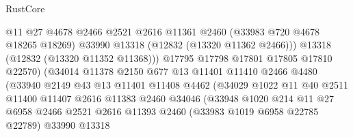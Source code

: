 \begin{lexlean}{RustCore}
\begin{coremodule}
                                    @11
                                    @27
                                    @4678
                                    @2466
                                    @2521
                                    @2616
                                    @11361
                                    @2460
                                    (@33983 @720 @4678 @18265 @18269)
                                    @33990
                                    @13318
                                    (@12832 (@13320 @11362 @2466)))
                                  @13318
                                  (@12832 (@13320 @11352 @11368)))
                                @17795
                                @17798
                                @17801
                                @17805
                                @17810
                                @22570)
                              (@34014
                                @11378
                                @2150
                                @677
                                @13
                                @11401
                                @11410
                                @2466
                                @4480
                                (@33940
                                  @2149
                                  @43
                                  @13
                                  @11401
                                  @11408
                                  @4462
                                  (@34029
                                    @1022
                                    @11
                                    @40
                                    @2511
                                    @11400
                                    @11407
                                    @2616
                                    @11383
                                    @2460
                                    @34046
                                    (@33948
                                      @1020
                                      @214
                                      @11
                                      @27
                                      @6958
                                      @2466
                                      @2521
                                      @2616
                                      @11393
                                      @2460
                                      (@33983 @1019 @6958 @22785 @22789)
                                      @33990
                                      @13318

\end{coremodule}
\end{lexlean}
